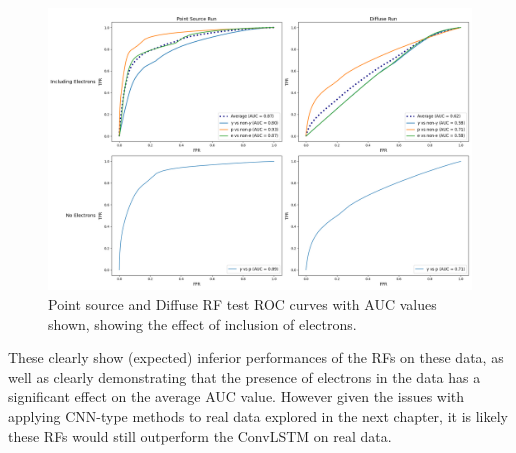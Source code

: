 \begin{figure}[ht] 
        \centering \includegraphics[width=1.0\columnwidth]{figures/rfplot.png}

        \caption{
                \label{fig:rfplot} %
                Point source and Diffuse RF test ROC curves with AUC values shown, showing the effect of inclusion of electrons.
        }
\end{figure}

These clearly show (expected) inferior performances of the RFs on these data, as well as clearly demonstrating that the presence of electrons in the data has a significant effect on the average AUC value. However given the issues with applying CNN-type methods to real data explored in the next chapter, it is likely these RFs would still outperform the ConvLSTM on real data.

